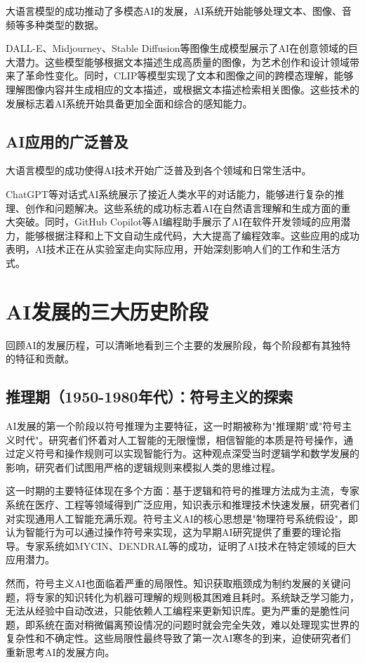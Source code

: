 大语言模型的成功推动了多模态AI的发展，AI系统开始能够处理文本、图像、音频等多种类型的数据。

DALL-E、Midjourney、Stable Diffusion等图像生成模型展示了AI在创意领域的巨大潜力。这些模型能够根据文本描述生成高质量的图像，为艺术创作和设计领域带来了革命性变化。同时，CLIP等模型实现了文本和图像之间的跨模态理解，能够理解图像内容并生成相应的文本描述，或根据文本描述检索相关图像。这些技术的发展标志着AI系统开始具备更加全面和综合的感知能力。

\subsection{AI应用的广泛普及}

大语言模型的成功使得AI技术开始广泛普及到各个领域和日常生活中。

ChatGPT等对话式AI系统展示了接近人类水平的对话能力，能够进行复杂的推理、创作和问题解决。这些系统的成功标志着AI在自然语言理解和生成方面的重大突破。同时，GitHub Copilot等AI编程助手展示了AI在软件开发领域的应用潜力，能够根据注释和上下文自动生成代码，大大提高了编程效率。这些应用的成功表明，AI技术正在从实验室走向实际应用，开始深刻影响人们的工作和生活方式。

\section{AI发展的三大历史阶段}

回顾AI的发展历程，可以清晰地看到三个主要的发展阶段，每个阶段都有其独特的特征和贡献。

\subsection{推理期（1950-1980年代）：符号主义的探索}

AI发展的第一个阶段以符号推理为主要特征，这一时期被称为"推理期"或"符号主义时代"。研究者们怀着对人工智能的无限憧憬，相信智能的本质是符号操作，通过定义符号和操作规则可以实现智能行为。这种观点深受当时逻辑学和数学发展的影响，研究者们试图用严格的逻辑规则来模拟人类的思维过程。

这一时期的主要特征体现在多个方面：基于逻辑和符号的推理方法成为主流，专家系统在医疗、工程等领域得到广泛应用，知识表示和推理技术快速发展，研究者们对实现通用人工智能充满乐观。符号主义AI的核心思想是"物理符号系统假设"，即认为智能行为可以通过操作符号来实现，这为早期AI研究提供了重要的理论指导。专家系统如MYCIN、DENDRAL等的成功，证明了AI技术在特定领域的巨大应用潜力。

然而，符号主义AI也面临着严重的局限性。知识获取瓶颈成为制约发展的关键问题，将专家的知识转化为机器可理解的规则极其困难且耗时。系统缺乏学习能力，无法从经验中自动改进，只能依赖人工编程来更新知识库。更为严重的是脆性问题，即系统在面对稍微偏离预设情况的问题时就会完全失效，难以处理现实世界的复杂性和不确定性。这些局限性最终导致了第一次AI寒冬的到来，迫使研究者们重新思考AI的发展方向。

